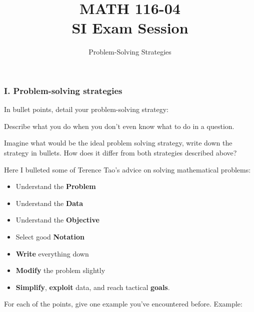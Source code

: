 \documentclass[12pt]{article}
\begin{document}

\title{MATH 116-04 \\ SI Exam Session}
\author{Problem-Solving Strategies}

\maketitle

\subsubsection*{I. Problem-solving strategies}
\vspace{5mm}
In bullet points, detail your problem-solving strategy:
\vspace{40mm}

Describe what you do when you don't even know what to do in a question.
\vspace{40mm}

Imagine what would be the ideal problem solving strategy, write down the strategy in bullets. How does it differ from both strategies described above?

\pagebreak
Here I bulleted some of Terence Tao's advice on solving mathematical problems:
\begin{itemize}
    \item Understand the \textbf{Problem}
    \item Understand the \textbf{Data}
    \item Understand the \textbf{Objective}
    \item Select good \textbf{Notation}
    \item \textbf{Write} everything down
    \item \textbf{Modify} the problem slightly
    \item \textbf{Simplify}, \textbf{exploit} data, and reach tactical \textbf{goals}.
\end{itemize}
\vspace{5mm}
For each of the points, give one example you've encountered before.
Example:



\pagebreak

\pagebreak
\end{document}
